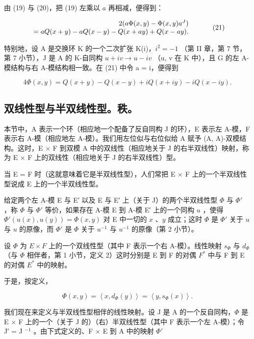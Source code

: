 由 (19) 与 (20)，把 (19) 左乘以 \(a\) 再相减，便得到：

\[
\begin{array}{r l} 2 (a \Phi (x, y) - \Phi (x, y) a ^ {J}) & \\ = a Q (x + y) - a Q (x - y) - Q (x + a y) + Q (x - a y). \end{array}\tag{21}
\]

特别地，设 A 是交换环 K 的一个二次扩张 K(i)，\(i^{2} = -1\) （第 II 章，第 7 节，第 7 小节），J 是 A 的 K-自同构 \(u + iv \rightarrow u - iv\) （u, v 在 K 中），且 G 的左 A-模结构与右 A-模结构相一致。在 (21) 中令 a = i，便得到

\[
4 \Phi (x, y) = Q (x + y) - Q (x - y) + i Q (x + i y) - i Q (x - i y). \tag {22}
\]

\subsection{双线性型与半双线性型。秩。}

本节中，A 表示一个环（相应地一个配备了反自同构 J 的环），E 表示左 A-模，F 表示右 A-模（相应地左 A-模）。我们用左位似与右位似给 A 赋予 (A, A)-双模结构。这时，E × F 到双模 A 中的双线性（相应地关于 J 的右半双线性）映射，称为 E × F 上的双线性（相应地关于 J 的右半双线性）型。

当 E = F 时（这就意味着它是半双线性型），人们常把 E × F 上的一个半双线性型说成 E 上的一个半双线性型。

给定两个左 A-模 E 与 E′ 以及 E 与 E′ 上（关于 J）的两个半双线性型 \(\Phi\) 与 \(\Phi'\) ，称 \(\Phi\) 与 \(\Phi'\) 等价，如果存在 A-模 E 到 A-模 E′ 上的一个同构 \(u\) ，使得 \(\Phi'(u(x), u(y)) = \Phi(x, y)\) 对 E 中一切的 \(x\) 、\(y\) 成立；这时 \(\Phi\) 是 \(\Phi'\) 关于 \(u\) 与 \(u\) 的原像，而 \(\Phi'\) 是 \(\Phi\) 关于 \(u^{-1}\) 与 \(u^{-1}\) 的原像（第 2 小节）。

设 \(\Phi\) 为 \(E \times F\) 上的一个双线性型（其中 F 表示一个右 A-模）。线性映射 \(s_{\Phi}\) 与 \(d_{\Phi}\) （与 \(\Phi\) 相伴者，第 1 小节，定义 2）这时分别是 E 到 F 的对偶 \(F^{*}\) 中与 F 到 E 的对偶 \(E^{*}\) 中的映射。

于是，按定义，

\[
\Phi (x, y) = \left\langle x, d _ {\Phi} (y) \right\rangle = \left\langle y, s _ {\Phi} (x) \right\rangle .\tag{23}
\]

我们现在来定义与半双线性型相伴的线性映射。设 J 是 A 的一个反自同构，\(\Phi\) 是 E × F 上的一个（关于 J 的）（右）半双线性型（其中 F 表示一个左 A-模）；令 J′ = J \(^{-1}\) 。由下式定义的、F × E 到 A 中的映射 \(\Phi'\)

